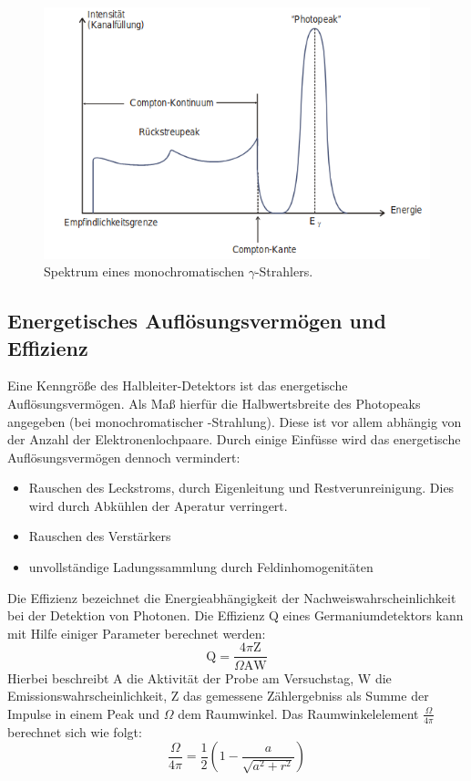 \begin{figure}
  \centering
  \includegraphics[scale=0.5]{Spektrum.png}
  \caption{Spektrum eines monochromatischen $\gamma$-Strahlers. \cite{Q1}}
  \label{abb:4}
\end{figure}

\subsection{Energetisches Auflösungsvermögen und Effizienz}
Eine Kenngröße des Halbleiter-Detektors ist das energetische Auflösungsvermögen.
Als Maß hierfür die Halbwertsbreite des Photopeaks angegeben (bei
monochromatischer \gamma-Strahlung). Diese ist vor allem abhängig von der
Anzahl der Elektronenlochpaare.
Durch einige Einfüsse wird das energetische Auflösungsvermögen dennoch vermindert:
\begin{itemize}
  \item Rauschen des Leckstroms, durch Eigenleitung und Restverunreinigung.
  Dies wird durch Abkühlen der Aperatur verringert.
  \item Rauschen des Verstärkers
  \item unvollständige Ladungssammlung durch Feldinhomogenitäten
\end{itemize}
Die Effizienz bezeichnet die Energieabhängigkeit der Nachweiswahrscheinlichkeit
bei der Detektion von Photonen.
Die Effizienz Q eines Germaniumdetektors kann mit Hilfe einiger Parameter berechnet werden:
\begin{equation}
    \label{eq:effizienz}
    \text{Q} = \frac{4 \pi \text{Z}}{\Omega \text{A} \text{W}}
\end{equation}
Hierbei beschreibt A die Aktivität der Probe am Versuchstag, W die Emissionswahrscheinlichkeit, Z das gemessene Zählergebniss als Summe der Impulse in einem Peak und $\Omega$ dem Raumwinkel.
Das Raumwinkelelement $\frac{\Omega}{4\pi}$ berechnet sich wie folgt:
\begin{equation}
    \label{eq:Omega}
    \frac{\Omega}{4 \pi} = \frac{1}{2} \left(1- \frac{a}{\sqrt{a^2 + r^2}} \right)
\end{equation}

